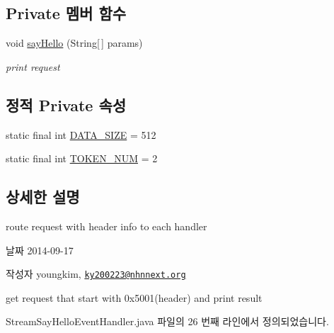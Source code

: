 \subsection*{Private 멤버 함수}
\begin{DoxyCompactItemize}
\item 
void \hyperlink{classweek8__server_1_1_stream_say_hello_event_handler_ad250ce0474a5ef1f7820ac2f03bac221}{say\-Hello} (String\mbox{[}$\,$\mbox{]} params)
\begin{DoxyCompactList}\small\item\em print request \end{DoxyCompactList}\end{DoxyCompactItemize}
\subsection*{정적 Private 속성}
\begin{DoxyCompactItemize}
\item 
static final int \hyperlink{classweek8__server_1_1_stream_say_hello_event_handler_aaaadade47c5c1093fa1b82e876039036}{D\-A\-T\-A\-\_\-\-S\-I\-Z\-E} = 512
\item 
static final int \hyperlink{classweek8__server_1_1_stream_say_hello_event_handler_aa6b191144a3deebb3779ddad8a10850d}{T\-O\-K\-E\-N\-\_\-\-N\-U\-M} = 2
\end{DoxyCompactItemize}


\subsection{상세한 설명}
route request with header info to each handler 

\begin{DoxyDate}{날짜}
2014-\/09-\/17 
\end{DoxyDate}
\begin{DoxyAuthor}{작성자}
youngkim, \href{mailto:ky200223@nhnnext.org}{\tt ky200223@nhnnext.\-org}
\end{DoxyAuthor}
get request that start with 0x5001(header) and print result 

Stream\-Say\-Hello\-Event\-Handler.\-java 파일의 26 번째 라인에서 정의되었습니다.



